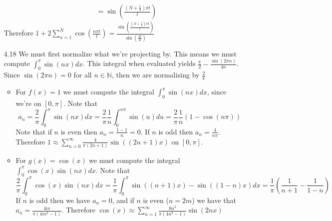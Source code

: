 \documentclass[12pt, letterpaper]{article}
\newcommand{\N}{\mathbb{N}}
\begin{document}
\begin{enumerate}
\begin{align*}
		&= \sin\left(\frac{(N+ \frac{1}{2})\pi t}{l}\right)
	\end{align*}
	Therefore $1 + 2 \sum_{n=1}^N \cos \left(\frac{n\pi t}{l}\right) = 
	\frac{\sin\left(\frac{\left(N+ \frac{1}{2}\right)\pi t}{l}\right)}{\sin \left( \frac{\pi t}{2l}\right)}$
	\item[4.18] We must first normalize what we're projecting by.  This means we must compute
	$\int_0^\pi \sin(nx)dx$.  This integral when evaluated yields 
	$\frac{\pi}{2} - \frac{\sin(2\pi n)}{4n}$.  Since $\sin(2 \pi n) = 0$ for all $n \in \N$,
	then we are normalizing by $\frac{2}{\pi}$
	\begin{itemize}
		\item For $f(x) = 1$ we must compute the integral $\int_0^\pi \sin(nx)dx$, since 
		we're on $[0,\pi]$.  Note that 
		$$
			a_n = \frac{2}{\pi}\int_0^\pi \sin(nx)dx = \frac{2}{\pi}\frac{1}{n} \int_0^{n \pi} \sin(u) du = 
			\frac{2}{\pi}\frac{1}{n}(1-\cos(n \pi))		
		$$  
		Note that if $n$ is even then $a_n = \frac{1-1}{n} = 0$.  If $n$ is odd then 
		$a_n = \frac{4}{n\pi}$.  Therefore 
		$1 \approx \sum_{n=0}^\infty \frac{4}{\pi(2n+1)}\sin((2n+1)x)$ on $[0,\pi]$.
		\item For $g(x) = \cos(x)$ we must compute the integral $\int_0^\pi \cos(x) \sin(nx)dx$.
		Note that 
		$$
		\frac{2}{\pi}\int_0^\pi \cos(x) \sin(nx)dx = 
		\frac{1}{\pi} \int_0^\pi \sin((n+1)x)- \sin((1-n)x)dx = 
		\frac{1}{\pi}\left( \frac{1}{n+1} - \frac{1}{1-n} \right)
		$$
		If $n$ is odd then we have $a_n = 0$, and if $n$ is even ($n=2m$) we have that 
		$a_n = \frac{4m}{\pi(4m^2 - 1)}$.  Therefore 
		$\cos(x) \approx \sum_{n=1}^\infty \frac{8n^2}{\pi(4n^2 -1)} \sin(2nx)$
	\end{itemize}
\end{enumerate}
\end{document}
